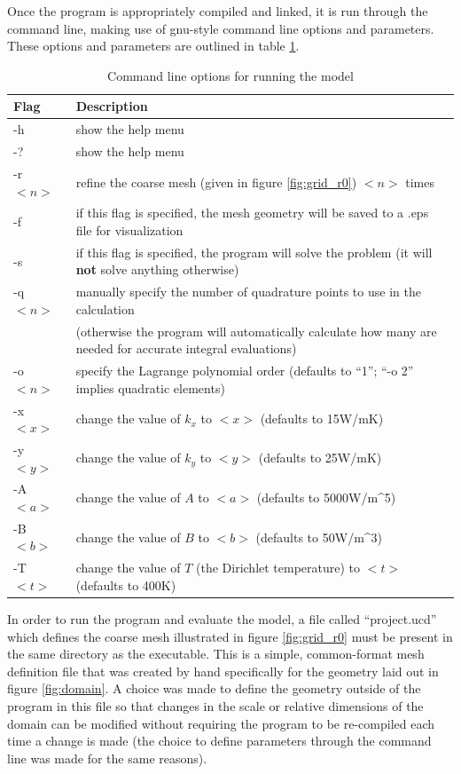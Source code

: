\documentclass[letterpaper,10pt]{article}
\begin{document}
Once the program is appropriately compiled and linked, it is run through the command line, making use of gnu-style command line options and parameters. These options and parameters are outlined in table \ref{tab:commandlineoptions}.

\begin{table}[H]
\centering
\caption{Command line options for running the model}
\label{tab:commandlineoptions}
\begin{tabular}{ll}
\hline \hline
Flag & Description \\
\hline
	-h & show the help menu \\
	-? & show the help menu \\
	-r $<n>$ & refine the coarse mesh (given in figure \ref{fig:grid_r0}) $<n>$ times \\
	-f & if this flag is specified, the mesh geometry will be saved to a .eps file for visualization \\
	-s & if this flag is specified, the program will solve the problem (it will \textbf{not} solve anything otherwise) \\
	-q $<n>$ & manually specify the number of quadrature points to use in the calculation \\
			 & (otherwise the program will automatically calculate how many are needed for accurate integral evaluations) \\
	-o $<n>$ & specify the Lagrange polynomial order (defaults to ``1''; ``-o 2'' implies quadratic elements) \\
	-x $<x>$ & change the value of $k_x$ to $<x>$ (defaults to \unit{15}{W/m\usk K}) \\
	-y $<y>$ & change the value of $k_y$ to $<y>$ (defaults to \unit{25}{W/m\usk K}) \\
	-A $<a>$ & change the value of $A$ to $<a>$ (defaults to \unit{5000}{W/m^5}) \\
	-B $<b>$ & change the value of $B$ to $<b>$ (defaults to \unit{50}{W/m^3}) \\
	-T $<t>$ & change the value of $T$ (the Dirichlet temperature) to $<t>$ (defaults to \unit{400}{K}) \\
\hline
\end{tabular}
\end{table}

In order to run the program and evaluate the model, a file called ``project.ucd'' which defines the coarse mesh illustrated in figure \ref{fig:grid_r0} must be present in the same directory as the executable. This is a simple, common-format mesh definition file that was created by hand specifically for the geometry laid out in figure \ref{fig:domain}. A choice was made to define the geometry outside of the program in this file so that changes in the scale or relative dimensions of the domain can be modified without requiring the program to be re-compiled each time a change is made (the choice to define parameters through the command line was made for the same reasons).
\end{document}
